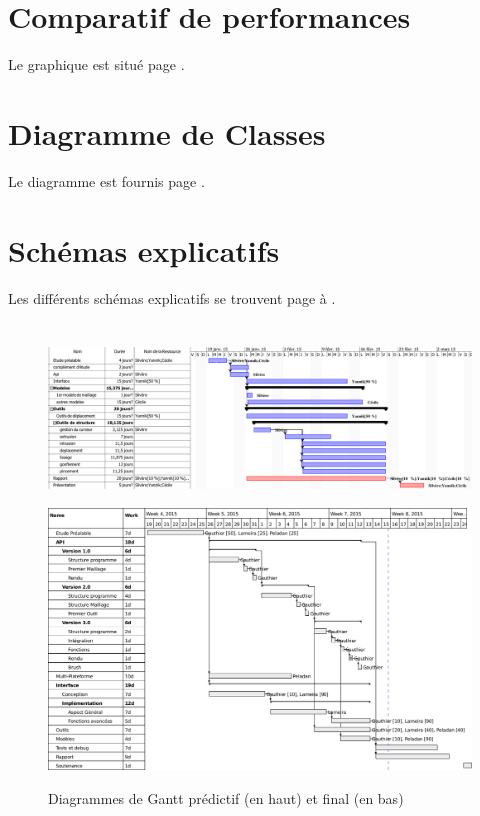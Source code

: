 \documentclass[a4paper]{memoir}
\begin{document}
		\section{Comparatif de performances}
			Le graphique est situé page \pageref{fig:analyse}.
			
		\section{Diagramme de Classes}
			Le diagramme est fournis page \pageref{fig:diagClass}.
			
		\section{Schémas explicatifs}
			Les différents schémas explicatifs se trouvent page \pageref{fig:subdivide} à \pageref{fig:cube}.
			
		\section*{}
			\newpage
			\begin{figure}
				\vspace{-3,5cm} \hspace{-4,5cm} \includegraphics[scale=0.6]{img/Gantt1.png}
			\end{figure}
			
			\begin{figure}
				\hspace{-5,25cm} \includegraphics[scale=0.5]{img/Gantt2.png}
				\label{fig:gantt}
				\caption{Diagrammes de Gantt prédictif (en haut) et final (en bas)}
			\end{figure}
			
\end{document}
